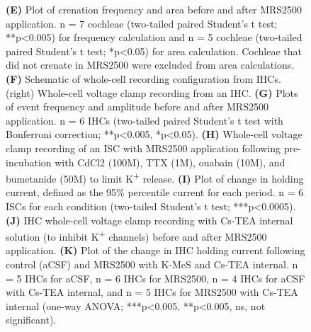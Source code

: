 \documentclass[9pt,lineno]{elife}
\begin{document}
\begin{figure} [t!]
\begin{fullwidth}
  \caption{\textbf{(E)} Plot of crenation frequency and area before and after MRS2500 application. n = 7 cochleae (two-tailed paired Student's t test; **p<0.005) for frequency calculation and n = 5 cochleae (two-tailed paired Student's t test; *p<0.05) for area calculation. Cochleae that did not crenate in MRS2500 were excluded from area calculations.
\textbf{(F)} Schematic of whole-cell recording configuration from IHCs. (right) Whole-cell voltage clamp recording from an IHC.
\textbf{(G)} Plots of event frequency and amplitude before and after MRS2500 application. n = 6 IHCs (two-tailed paired Student's t test with Bonferroni correction; **p<0.005, *p<0.05).
\textbf{(H)} Whole-cell voltage clamp recording of an ISC with MRS2500 application following pre-incubation with CdCl2 (100\textmu M), TTX (1\textmu M), ouabain (10\textmu M), and bumetanide (50\textmu M) to limit K\textsuperscript{+} release.
\textbf{(I)} Plot of change in holding current, defined as the 95\% percentile current for each period. n = 6 ISCs for each condition (two-tailed Student’s t test; ***p<0.0005). 
\textbf{(J)} IHC whole-cell voltage clamp recording with Cs-TEA internal solution (to inhibit K\textsuperscript{+} channels) before and after MRS2500 application.
\textbf{(K)} Plot of the change in IHC holding current following control (aCSF) and MRS2500 with K-MeS and Cs-TEA internal. n = 5 IHCs for aCSF, n = 6 IHCs for MRS2500, n = 4 IHCs for aCSF with Cs-TEA internal, and n = 5 IHCs for MRS2500 with Cs-TEA internal (one-way ANOVA; ***p<0.005, **p<0.005, ns, not significant).
}
\end{fullwidth}
\end{figure}
\end{document}
